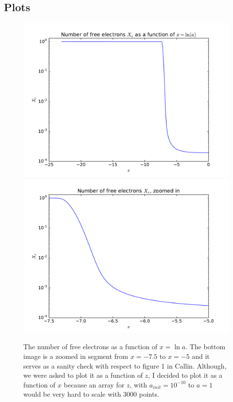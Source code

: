 \documentclass[12pt]{article}
\begin{document}
\subsection*{Plots}
\begin{figure}[H]
\centering
\includegraphics[width=0.75\linewidth]{Plots/ElectronNumber.pdf}
\includegraphics[width=0.75\linewidth]{Plots/ElectronNumberZoomed.pdf}
\caption{The number of free electrons as a function of $x=\ln a$. The bottom image is a zoomed in segment from $x=-7.5$ to $x=-5$ and it serves as a sanity check with respect to figure 1 in Callin. Although, we were asked to plot it as a function of $z$, I decided to plot it as a function of $x$ because an array for $z$, with $a_{init}=10^{-10}$ to $a=1$ would be very hard to scale with 3000 points.}
\end{figure}

\end{document}
